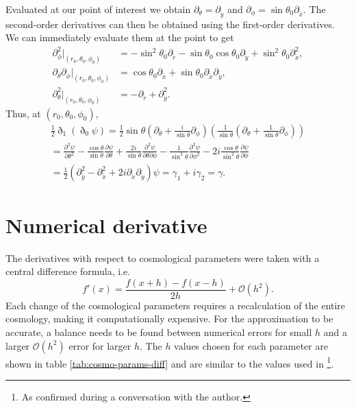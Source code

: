 \documentclass[11pt]{article} %
\begin{document}
Evaluated at our point of interest we obtain $\partial_\theta=\partial_{\tilde y}$ and $\partial_\phi=\sin\theta_0\partial_{\tilde x}$. The second-order derivatives can then be obtained using the first-order derivatives. We can immediately evaluate them at the point to get
\begin{align*}
    \partial_\phi^2|_{(r_0,\theta_0,\phi_0)}&=-\sin^2\theta_0\partial_{\tilde r}-\sin\theta_0\cos\theta_0\partial_{\tilde y}+\sin^2\theta_0\partial^2_{\tilde x},\\
    \partial_\theta\partial_\phi|_{(r_0,\theta_0,\phi_0)}&=\cos\theta_0\partial_{\tilde x}+\sin\theta_0\partial_{\tilde x}\partial_{\tilde y},\\
    \partial_\theta^2|_{(r_0,\theta_0,\phi_0)}&=-\partial_{\tilde r}+\partial^2_{\tilde y}.
\end{align*}
Thus, at $(r_0, \theta_0, \phi_0)$,
\begin{gather*}
    \frac{1}{2}\eth_1(\eth_0\psi) = \frac{1}{2}\sin\theta(\partial_\theta+\frac{i}{\sin\theta}\partial_\phi)(\frac{1}{\sin\theta}(\partial_\theta+\frac{1}{\sin\theta}\partial_\phi))\\
    =\frac{\partial^2 \psi}{\partial \theta^2} - \frac{\cos\theta}{\sin\theta} \frac{\partial \psi}{\partial \theta} + \frac{2 i}{\sin\theta} \frac{\partial^2 \psi}{\partial \theta \partial \phi} - \frac{1}{\sin^2\theta} \frac{\partial^2 \psi}{\partial \phi^2} - 2 i \frac{\cos\theta}{\sin^2\theta} \frac{\partial \psi}{\partial \phi}\\
    =\frac{1}{2}(\partial_{\tilde y}^2 - \partial_{\tilde x}^2 + 2i\partial_{\tilde x}\partial_{\tilde y})\psi
    =\gamma_1 + i\gamma_2 = \gamma.
\end{gather*}

\section{Numerical derivative}
\label{sec:derivatives}
The derivatives with respect to cosmological parameters were taken with a central difference formula, i.e.
\begin{equation*}
    f'(x) = \frac{f(x+h) - f(x-h)}{2h} + \mathcal O (h^2).
\end{equation*}
Each change of the cosmological parameters requires a recalculation of the entire cosmology, making it computationally expensive. For the approximation to be accurate, a balance needs to be found between numerical errors for small $h$ and a larger $\mathcal O(h^2)$ error for larger $h$. The $h$ values chosen for each parameter are shown in table \ref{tab:cosmo-params-diff} and are similar to the values used in \cite{Namikawa_2016}\footnote{As confirmed during a conversation with the author.}.
\end{document}
